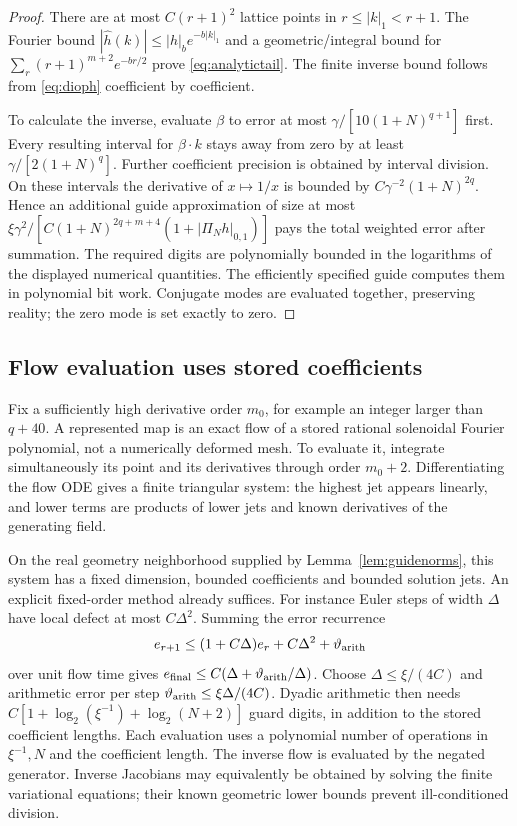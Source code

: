 \documentclass[11pt,a4paper]{amsart}
\theoremstyle{definition}
\theoremstyle{remark}
\numberwithin{equation}{section}
\begin{document}
\begin{proof}
There are at most $C(r+1)^2$ lattice points in $r\le|k|_1<r+1$. The Fourier bound
$|\widehat h(k)|\le|h|_be^{-b|k|_1}$ and a geometric/integral bound for
$\sum_r(r+1)^{m+2}e^{-br/2}$ prove \eqref{eq:analytictail}.
The finite inverse bound follows from \eqref{eq:dioph} coefficient by coefficient.

To calculate the inverse, evaluate $\beta$ to error at most
$\gamma/[10(1+N)^{q+1}]$ first. Every resulting interval for $\beta\cdot k$ stays away from zero by at least $\gamma/[2(1+N)^q]$. Further coefficient precision is obtained by interval division. On these intervals the derivative of $x\mapsto1/x$ is bounded by $C\gamma^{-2}(1+N)^{2q}$. Hence an additional guide approximation of size at most
$\xi\gamma^2/[C(1+N)^{2q+m+4}(1+|\Pi_Nh|_{0,1})]$
pays the total weighted error after summation. The required digits are polynomially bounded in the logarithms of the displayed numerical quantities. The efficiently specified guide computes them in polynomial bit work. Conjugate modes are evaluated together, preserving reality; the zero mode is set exactly to zero.
\end{proof}

\subsection{Flow evaluation uses stored coefficients}
Fix a sufficiently high derivative order $m_0$, for example an integer larger than $q+40$. A represented map is an exact flow of a stored rational solenoidal Fourier polynomial, not a numerically deformed mesh. To evaluate it, integrate simultaneously its point and its derivatives through order $m_0+2$. Differentiating the flow ODE gives a finite triangular system: the highest jet appears linearly, and lower terms are products of lower jets and known derivatives of the generating field.

On the real geometry neighborhood supplied by Lemma~\ref{lem:guidenorms}, this system has a fixed dimension, bounded coefficients and bounded solution jets. An explicit fixed-order method already suffices. For instance Euler steps of width $\Delta$ have local defect at most $C\Delta^2$. Summing the error recurrence
\[
 e_{r+1}\le(1+C\Delta)e_r+C\Delta^2+\vartheta_{\rm arith}
\]
over unit flow time gives $e_{\rm final}\le C(\Delta+\vartheta_{\rm arith}/\Delta)$.
Choose $\Delta\le\xi/(4C)$ and arithmetic error per step
$\vartheta_{\rm arith}\le\xi\Delta/(4C)$. Dyadic arithmetic then needs
$C[1+\log_2(\xi^{-1})+\log_2(N+2)]$ guard digits, in addition to the stored coefficient lengths. Each evaluation uses a polynomial number of operations in $\xi^{-1},N$ and the coefficient length. The inverse flow is evaluated by the negated generator. Inverse Jacobians may equivalently be obtained by solving the finite variational equations; their known geometric lower bounds prevent ill-conditioned division.
\end{document}
